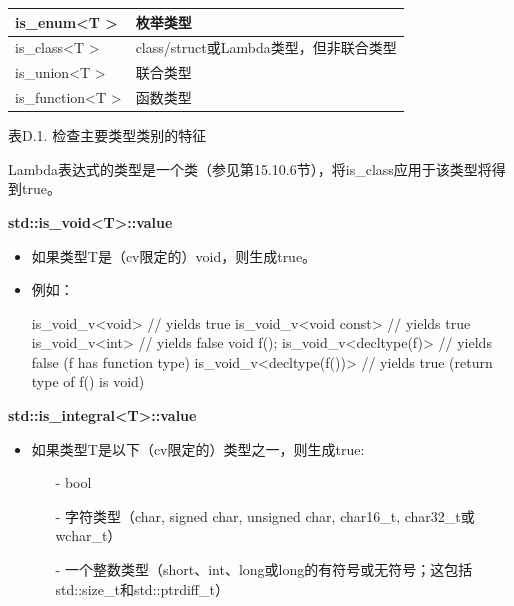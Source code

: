 \begin{table}[H]
\begin{tabular}{|l|l|}
		is\_enum\textless{}T \textgreater{}                      & 枚举类型                                                                         \\ \hline
		is\_class\textless{}T \textgreater{}                     & class/struct或Lambda类型，但非联合类型                                                               \\ \hline
		is\_union\textless{}T \textgreater{}                     & 联合类型                                                                                                    \\ \hline
		is\_function\textless{}T \textgreater{}                  & 函数类型                                                                                                  \\ \hline
	\end{tabular}
\end{table}

\begin{center}
表D.1. 检查主要类型类别的特征
\end{center}

Lambda表达式的类型是一个类（参见第15.10.6节），将is\_class应用于该类型将得到true。

\textbf{std::is\_void<T>::value}

\begin{itemize}
\item 
如果类型T是（cv限定的）void，则生成true。

\item 
例如：
\begin{cpp}
is_void_v<void> // yields true
is_void_v<void const> // yields true
is_void_v<int> // yields false
void f();
is_void_v<decltype(f)> // yields false (f has function type)
is_void_v<decltype(f())> // yields true (return type of f() is void)
\end{cpp}

\end{itemize}

\textbf{std::is\_integral<T>::value}

\begin{itemize}
\item 
如果类型T是以下（cv限定的）类型之一，则生成true:

\begin{itemize}
\item [-]
bool

\item [-]
字符类型（char, signed char, unsigned char, char16\_t, char32\_t或wchar\_t）

\item [-]
一个整数类型（short、int、long或long的有符号或无符号；这包括std::size\_t和std::ptrdiff\_t）
\end{itemize}

\end{itemize}

